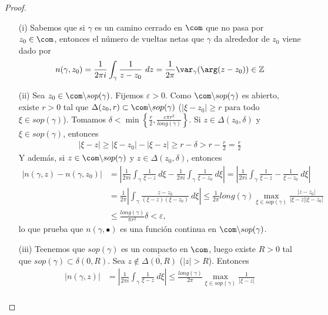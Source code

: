\begin{proof}
\begin{enumerate}
    \item[(i)] Sabemos que si $\gamma$ es un camino cerrado en $\com$ que no pasa por $z_0 \in \com$, entonces el número de vueltas netas que $\gamma$ da alrededor de $z_0$ viene dado por
    \begin{align*}
        n(\gamma,z_0) = \frac{1}{2\pi i}\int_{\gamma}{\frac{1}{z-z_0} \ dz} = \frac{1}{2\pi}\var_{\gamma}(\arg(z-z_0)) \in \mathbb{Z}
    \end{align*}
    \item[(ii)] Sea $z_0 \in \com \backslash sop(\gamma)$. Fijemos $\varepsilon > 0$. Como $\com \backslash sop(\gamma)$ es abierto, existe $r > 0$ tal que $\Delta(z_0,r) \subset \com \backslash sop(\gamma)$ ($|\xi - z_0| \ge r$ para todo $\xi \in sop(\gamma)$). Tomamos $\delta < \min\left\{ \frac{r}{2}, \frac{\varepsilon \pi r^2}{long(\gamma)}\right\}$. Si $z \in \Delta(z_0,\delta)$ y $\xi \in sop(\gamma)$, entonces
    \begin{align*}
        |\xi - z| \ge |\xi - z_0| - |\xi - z| \ge r - \delta > r - \frac{r}{2} = \frac{r}{2}
    \end{align*}
    Y además, si $z \in \com \backslash sop(\gamma)$ y $z \in \Delta(z_0,\delta)$, entonces
    \begin{align*}
        |n(\gamma,z) - n(\gamma,z_0)| &= \left| \frac{1}{2\pi i}\int_{\gamma}{\frac{1}{\xi - z} \ d\xi} - \frac{1}{2\pi i}\int_{\gamma}{\frac{1}{\xi - z_0} \ d\xi} \right| = \left| \frac{1}{2\pi i}\int_{\gamma}{\frac{1}{\xi - z} - \frac{1}{\xi - z_0} \ d\xi}  \right| \\
        &= \frac{1}{2\pi}\left| \int_{\gamma}{\frac{z - z_0}{(\xi - z)(\xi - z_0)} \ d\xi}\right| \leq \frac{1}{2\pi} long(\gamma) \max_{\xi \in sop(\gamma)}\frac{|z-z_0|}{|\xi -z||\xi - z_0|} \\
        & \leq \frac{long(\gamma)}{\pi r^2}\delta < \varepsilon,
    \end{align*}
    lo que prueba que $n(\gamma, \bullet)$ es una función continua en $\com \backslash sop(\gamma)$.
    \item[(iii)] Teenemos que $sop(\gamma)$ es un compacto en $\com$, luego existe $R > 0$ tal que $sop(\gamma) \subset \delta(0,R)$. Sea $z \not \in \overline{\Delta(0,R)}$ ($|z| > R$). Entonces
    \begin{align*}
        |n(\gamma,z)| &= \left| \frac{1}{2\pi i} \int_{\gamma}{\frac{1}{\xi - z} \ d\xi} \right| \leq \frac{long(\gamma)}{2\pi} \max_{\xi \in sop(\gamma)}\frac{1}{|\xi - z|} \\

\end{align*}
\end{enumerate}
\end{proof}
